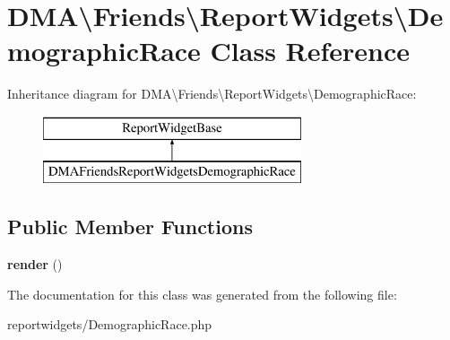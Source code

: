\hypertarget{classDMA_1_1Friends_1_1ReportWidgets_1_1DemographicRace}{}\section{D\+M\+A\textbackslash{}Friends\textbackslash{}Report\+Widgets\textbackslash{}Demographic\+Race Class Reference}
\label{classDMA_1_1Friends_1_1ReportWidgets_1_1DemographicRace}
Inheritance diagram for D\+M\+A\textbackslash{}Friends\textbackslash{}Report\+Widgets\textbackslash{}Demographic\+Race\+:\begin{figure}[H]
\begin{center}
\leavevmode
\includegraphics[height=2.000000cm]{dc/d2e/classDMA_1_1Friends_1_1ReportWidgets_1_1DemographicRace}
\end{center}
\end{figure}
\subsection*{Public Member Functions}
\begin{DoxyCompactItemize}
\item 
\hypertarget{classDMA_1_1Friends_1_1ReportWidgets_1_1DemographicRace_a09b9e6889e03f9bb81078cc1abdfa194}{}{\bfseries render} ()\label{classDMA_1_1Friends_1_1ReportWidgets_1_1DemographicRace_a09b9e6889e03f9bb81078cc1abdfa194}

\end{DoxyCompactItemize}


The documentation for this class was generated from the following file\+:\begin{DoxyCompactItemize}
\item 
reportwidgets/Demographic\+Race.\+php\end{DoxyCompactItemize}
